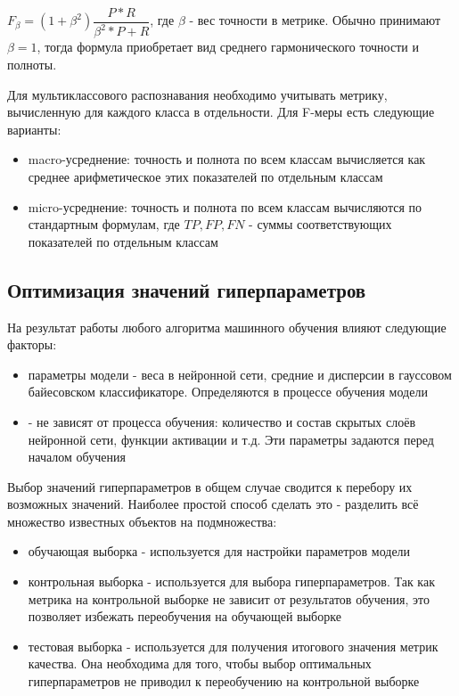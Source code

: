 $F_\beta=(1+\beta^2)\dfrac{P*R}{\beta^2*P+R}$, где $\beta$ - вес точности в метрике. Обычно принимают $\beta=1$, тогда формула приобретает вид среднего гармонического точности и полноты. 

Для мультиклассового распознавания необходимо учитывать метрику, вычисленную для каждого класса в отдельности. Для F-меры есть следующие варианты\cite{sklearn_metric}:

\begin{itemize}
\item macro-усреднение: точность и полнота по всем классам вычисляется как среднее арифметическое этих показателей по отдельным классам
\item micro-усреднение: точность и полнота по всем классам вычисляются по стандартным формулам, где $TP, FP, FN$ - суммы соответствующих показателей по отдельным классам
\end{itemize}

\subsection{Оптимизация значений гиперпараметров}

На результат работы любого алгоритма машинного обучения влияют следующие факторы:

\begin{itemize}
\item параметры модели - веса в нейронной сети, средние и дисперсии в гауссовом байесовском классификаторе. Определяются в процессе обучения модели
\item {} - не зависят от процесса обучения: количество и состав скрытых слоёв нейронной сети, функции активации и т.д. Эти параметры задаются перед началом обучения
\end{itemize}

Выбор значений гиперпараметров в общем случае сводится к перебору их возможных значений. Наиболее простой способ сделать это - разделить всё множество известных объектов на подмножества:

\begin{itemize}
\item обучающая выборка - используется для настройки параметров модели
\item контрольная выборка - используется для выбора гиперпараметров. Так как метрика на контрольной выборке не зависит от результатов обучения, это позволяет избежать переобучения на обучающей выборке
\item тестовая выборка - используется для получения итогового значения метрик качества. Она необходима для того, чтобы выбор оптимальных гиперпараметров не приводил к переобучению на контрольной выборке
\end{itemize}

